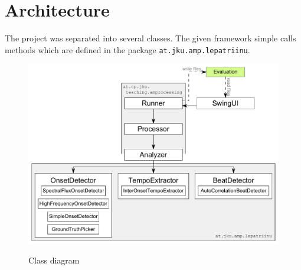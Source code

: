 \chapter{Architecture} \label{cpt:architecture}

The project was separated into several classes. The given framework simple calls
methods which are defined in the package \texttt{at.jku.amp.lepatriinu}.


\begin{figure}[htp]
  \centering
  \includegraphics[width=\textwidth]{chapter/ClassDiagram}
  \label{fig:classdiagram}
  \caption{Class diagram}
\end{figure}